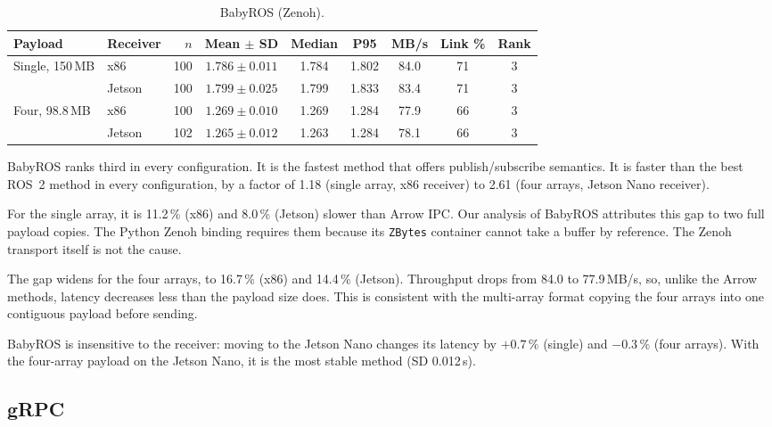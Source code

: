 \begin{table}[t]
  \centering
  \caption{BabyROS (Zenoh).}
  \label{tab:babyros}
  \small
  \setlength{\tabcolsep}{4pt}
  \begin{tabular}{llrcccccc}
    \toprule
    Payload & Receiver & $n$ & Mean $\pm$ SD & Median & P95 & MB/s & Link \% & Rank \\
    \midrule
    Single, 150\,MB & x86    & 100 & $1.786 \pm 0.011$ & 1.784 & 1.802 & 84.0 & 71 & 3 \\
                    & Jetson & 100 & $1.799 \pm 0.025$ & 1.799 & 1.833 & 83.4 & 71 & 3 \\
    \addlinespace
    Four, 98.8\,MB  & x86    & 100 & $1.269 \pm 0.010$ & 1.269 & 1.284 & 77.9 & 66 & 3 \\
                    & Jetson & 102 & $1.265 \pm 0.012$ & 1.263 & 1.284 & 78.1 & 66 & 3 \\
    \bottomrule
  \end{tabular}
\end{table}

BabyROS ranks third in every configuration. It is the fastest method that offers
publish/subscribe semantics. It is faster than the best ROS~2 method in every
configuration, by a factor of 1.18 (single array, x86 receiver) to 2.61 (four arrays,
Jetson Nano receiver).

For the single array, it is 11.2\,\% (x86) and 8.0\,\% (Jetson) slower than Arrow IPC.
Our analysis of BabyROS attributes this gap to two full payload copies. The Python
Zenoh binding requires them because its \texttt{ZBytes} container cannot take a buffer
by reference. The Zenoh transport itself is not the cause.

The gap widens for the four arrays, to 16.7\,\% (x86) and 14.4\,\% (Jetson).
Throughput drops from 84.0 to 77.9\,MB/s, so, unlike the Arrow methods, latency
decreases less than the payload size does. This is consistent with the multi-array
format copying the four arrays into one contiguous payload before sending.

BabyROS is insensitive to the receiver: moving to the Jetson Nano changes its latency
by $+0.7\,\%$ (single) and $-0.3\,\%$ (four arrays). With the four-array payload on the
Jetson Nano, it is the most stable method (SD 0.012\,s).

\subsection{gRPC}
\label{sec:res-grpc}

